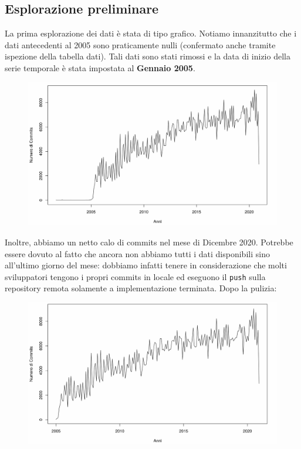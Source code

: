\documentclass[11pt,a4paper]{article}
\begin{document}
\subsection{Esplorazione preliminare}
La prima esplorazione dei dati \`e stata di tipo grafico. Notiamo innanzitutto
che i dati antecedenti al 2005 sono praticamente nulli (confermato anche tramite
ispezione della tabella dati). Tali dati sono stati rimossi e la data di inizio
della serie temporale \`e stata impostata al \textbf{Gennaio 2005}.
\clearpage
\begin{figure}[H]
	\vspace{-1.5cm}
	\hspace{-1.5cm}
	\includegraphics[scale=0.7]{imgs/ts_plot_1.pdf}
	\vspace{-0.8cm}
\end{figure}
\noindent
Inoltre, abbiamo un netto calo di commits nel mese di Dicembre 2020. Potrebbe
essere dovuto al fatto che ancora non abbiamo tutti i dati disponibili sino
all'ultimo giorno del mese: dobbiamo infatti tenere in considerazione che molti
sviluppatori tengono i propri commits in locale ed eseguono il \texttt{push}
sulla repository remota solamente a implementazione terminata. Dopo la pulizia:
\begin{figure}[H]
	\includegraphics[scale=0.6]{imgs/ts_plot_2.pdf}
	\vspace{-1.0cm}
\end{figure}
\end{document}
